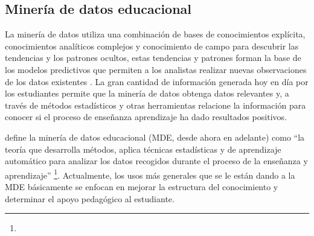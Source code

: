 \subsection{Minería de datos educacional}
La minería de datos utiliza una combinación de bases de conocimientos explícita, conocimientos analíticos complejos y conocimiento de campo para descubrir las tendencias y los patrones ocultos, estas tendencias y patrones forman la base de los modelos predictivos que permiten a los analistas realizar nuevas observaciones de los datos existentes \parencite{luan2002data}. La gran cantidad de información generada hoy en día por los estudiantes permite que la minería de datos obtenga datos relevantes y, a través de métodos estadísticos y otras herramientas relacione la información para conocer si el proceso de enseñanza aprendizaje ha dado resultados positivos. 

\textcite[p.~9]{mining2012enhancing} define la minería de datos educacional (MDE, desde ahora en adelante) como “la teoría que desarrolla métodos, aplica técnicas estadísticas y de aprendizaje automático para analizar los datos recogidos durante el proceso de la enseñanza y aprendizaje” \footnote{\traduccionlibre}. Actualmente, los usos más generales que se le están dando a la MDE básicamente se enfocan en mejorar la estructura del conocimiento y determinar el apoyo pedagógico al estudiante.